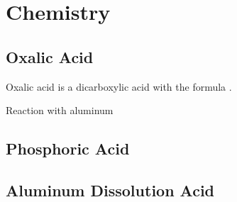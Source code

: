 \documentclass[../thesis.tex]{subfiles}
\begin{document}
    \section{Chemistry}
\label{sec:chemistry}

    \subsection{Oxalic Acid}
    \label{subsec:oxalic-acid}

        Oxalic acid is a dicarboxylic acid with the formula .


        Reaction with aluminum


    \subsection{Phosphoric Acid}
    \label{subsec:phosphoric-acid}


    \subsection{Aluminum Dissolution Acid}
    \label{subsec:al-dis-acid}
\end{document}
